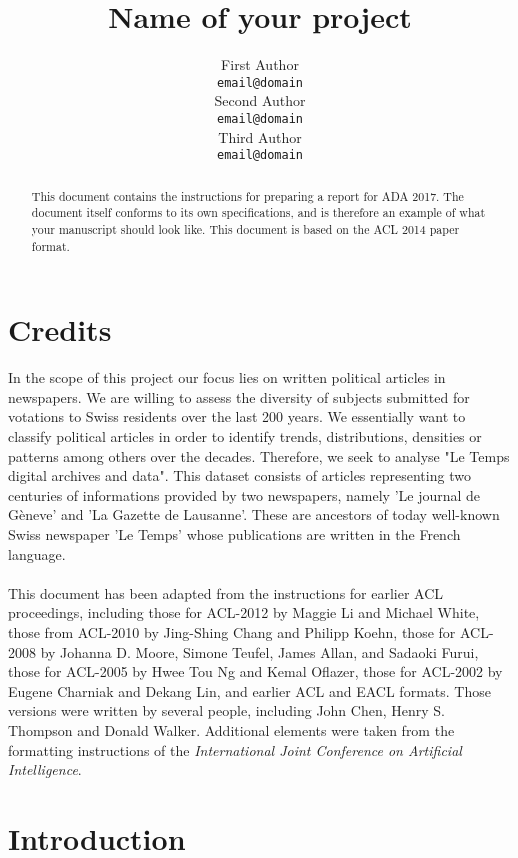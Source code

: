 \documentclass[11pt]{article}
\title{Name of your project}
\author{First Author \\
  {\tt email@domain} \\\And
  Second Author \\
  {\tt email@domain} \\\And
Third Author \\
{\tt email@domain} \\}
\date{}
\begin{document}
\begin{abstract}
  This document contains the instructions for preparing a report for ADA 2017. The document itself conforms to its own specifications, and is therefore an example of
  what your manuscript should look like. This document is based on the ACL 2014 paper format.
\end{abstract}

\section{Credits}


In the scope of this project our focus lies on written political articles in newspapers.
We are willing to assess the diversity of subjects submitted for votations to Swiss residents over
the last 200 years. We essentially want to classify political articles in order to identify trends,
distributions, densities or patterns among others over the decades. Therefore, we seek to analyse 
"Le Temps digital archives and data". This dataset consists of articles representing two centuries
of informations provided by two newspapers, namely 'Le journal de Gèneve' and 'La Gazette de Lausanne'.
These are ancestors of today well-known Swiss newspaper 'Le Temps' whose publications are written in
the French language.
\\
\\
This document has been adapted from the instructions for earlier ACL
proceedings, including those for ACL-2012 by Maggie Li and Michael
White, those from ACL-2010 by Jing-Shing Chang and Philipp Koehn,
those for ACL-2008 by Johanna D. Moore, Simone Teufel, James Allan,
and Sadaoki Furui, those for ACL-2005 by Hwee Tou Ng and Kemal
Oflazer, those for ACL-2002 by Eugene Charniak and Dekang Lin, and
earlier ACL and EACL formats. Those versions were written by several
people, including John Chen, Henry S. Thompson and Donald
Walker. Additional elements were taken from the formatting
instructions of the {\em International Joint Conference on Artificial
  Intelligence}.

\section{Introduction}
\end{document}
